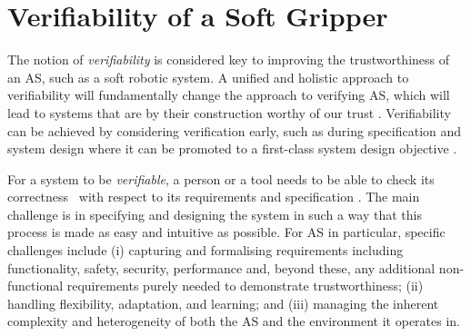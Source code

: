 \documentclass[lettersize,journal]{IEEEtran}
\begin{document}
\section{Verifiability of a Soft Gripper} \label{verifiability}
The notion of \emph{verifiability} is considered key to improving the trustworthiness of an AS, such as a soft robotic system. 
A unified and holistic approach to verifiability will fundamentally change the approach to verifying AS, which will lead to systems that are by their construction worthy of our trust \cite{Mousavi2022}. 
Verifiability can be achieved by considering verification early, such as during specification and system design \cite{Mousavi2022} where it can be promoted to a first-class system design objective \cite{Eder2021}. 

For a system to be {\em verifiable\/}, a person or a tool needs to be able to check its correctness~\cite{ISO24765:2017} with respect to its requirements and specification \cite{Abeywickrama2022}. 
The main challenge is in specifying and designing the system in such a way that this process is made as easy and intuitive as possible.
%
For AS in particular, specific challenges include 
%
(i) capturing and formalising requirements including functionality, safety, security, performance and, beyond these, any additional non-functional requirements purely needed to demonstrate trustworthiness; 
%	 
(ii) handling flexibility, adaptation, and learning; and 
%
(iii) managing the inherent complexity and heterogeneity of both the AS and the environment it operates in. 
\end{document}
